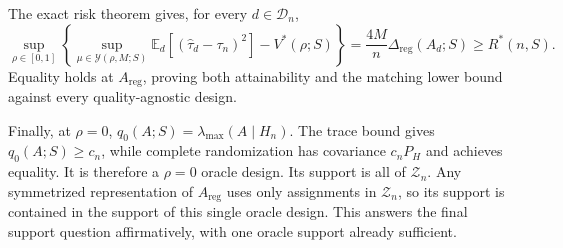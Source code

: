 The exact risk theorem gives, for every \(d\in\mathcal D_n\),
\[
\sup_{\rho\in[0,1]}
\left\{
\sup_{\mu\in\mathcal Y(\rho,M;S)}
\mathbb E_d[(\widehat\tau_d-\tau_n)^2]-V^*(\rho;S)
\right\}
=\frac{4M}{n}\Delta_{\mathrm{reg}}(A_d;S)
\geq R^*(n,S).
\]
Equality holds at \(A_{\mathrm{reg}}\), proving both attainability and the matching lower bound against every quality-agnostic design.

Finally, at \(\rho=0\), \(q_0(A;S)=\lambda_{\max}(A\mid H_n)\).  The trace bound gives \(q_0(A;S)\geq c_n\), while complete randomization has covariance \(c_nP_H\) and achieves equality.  It is therefore a \(\rho=0\) oracle design.  Its support is all of \(\mathcal Z_n\).  Any symmetrized representation of \(A_{\mathrm{reg}}\) uses only assignments in \(\mathcal Z_n\), so its support is contained in the support of this single oracle design.  This answers the final support question affirmatively, with one oracle support already sufficient.